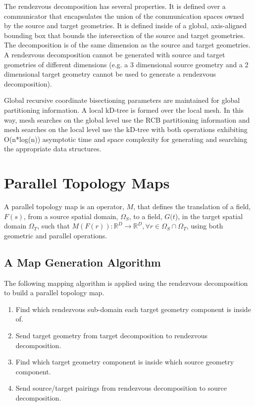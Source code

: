\documentclass[letterpaper,12pt]{article}
\begin{document}
The rendezvous decomposition has several properties. It is defined
over a communicator that encapsulates the union of the communication
spaces owned by the source and target geometries. It is defined inside
of a global, axis-aligned bounding box that bounds the intersection of
the source and target geometries. The decomposition is of the same
dimension as the source and target geometries. A rendezvous
decomposition cannot be generated with source and target geometries of
different dimensions (e.g. a 3 dimensional source geometry and a 2
dimensional target geometry cannot be used to generate a rendezvous
decomposition). 

Global recursive coordinate bisectioning parameters
are maintained for global partitioning information. A local kD-tree is
formed over the local mesh. In this way, mesh searches on the global
level use the RCB partitioning information and mesh searches on the
local level use the kD-tree with both operations exhibiting
O(n*log(n)) asymptotic time and space complexity for generating and
searching the appropriate data structures.

\clearpage

\section{Parallel Topology Maps}\label{sec:map}

A parallel topology map is an operator, $M$, that defines the
translation of a field, $F(s)$, from a source spatial domain,
$\Omega_S$, to a field, $G(t$), in the target spatial domain
$\Omega_T$, such that $M( F(r) ) : \mathbb{R}^D \rightarrow
\mathbb{R}^D, \forall r \in \Omega_S \cap \Omega_T$, using both
geometric and parallel operations.

\subsection{A Map Generation Algorithm}\label{subsec:map_algorithm}
The following mapping algorithm is applied using the rendezvous
decomposition to build a parallel topology map.

\begin{enumerate}
\item Find which rendezvous sub-domain each target geometry component
  is inside of.
\item Send target geometry from target decomposition to rendezvous
  decomposition.
\item Find which target geometry component is inside which source
  geometry component.
\item Send source/target pairings from rendezvous decomposition to
  source decomposition.
\end{enumerate}
\end{document}
